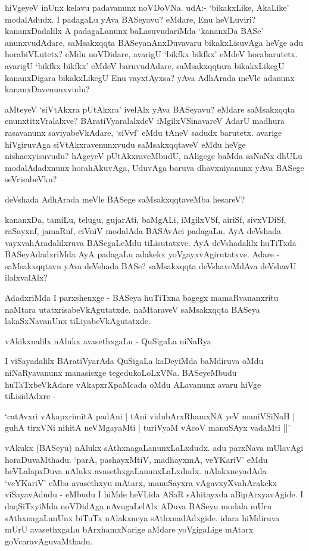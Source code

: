hiVgeyeV inUnx kelavu padavanunx noVDoVNa. udA:- `bikakxLike, AkaLike' modalAdudx. I padagaLu yAva BASeyavu? eMdare, Enu heVLuviri? kananxDadalilx A padagaLanunx baLasuvudariMda `kananxDa BASe' anunxvudAdare, saMsakxqqta BASeyanAnxDuvavaru bikakxLisuvAga heVge adu horabiVLutetx? eMdu noVDidare, avarigU `bikfkx bikfkx' eMdeV horabarutetx. avarigU `bikfkx bikfkx' eMdeV baruvudAdare, saMsakxqqtara bikakxLikegU kananxDigara bikakxLikegU Enu vayxtAyxsa? yAva AdhArada meVle adanunx kananxDavenunxvudu?

aMteyeV `siVtAkxra pUtAkxra' ivelAlx yAva BASeyavu? eMdare saMsakxqqta enunxtitxVralalxve? BAratiVyaralalxdeV iMgilxVSinavareV AdarU madhura rasavanunx saviyabeVkAdare, `siVvf' eMdu tAneV sadudx barutetx. avarige hiVgiruvAga siVtAkxravenunxvudu saMsakxqqtaveV eMdu heVge nishacxyisuvudu? hAgeyeV pUtAkxraveMbudU, nAligege baMda saNaNx dhULu modalAdadxnunx horahAkuvAga, UduvAga baruva dhavxniyanunx yAva BASege seVrisabeVku?

deVshada AdhArada meVle BASege saMsakxqqtaveMba hesareV?

kananxDa, tamiLu, telugu, gujarAti, baMgALi, iMgilxVSf, airiSf, sivxVDiSf, raSayxnf, jamaRnf, ciVniV modalAda BASAvAci padagaLu, AyA deVshada vayxvahAradalilxruva BASegaLeMdu tiLisutatxve. AyA deVshadalilx huTiTxda BASeyAdadxriMda AyA padagaLu adakekx yoVgayxvAgirutatxve. Adare - saMsakxqqtavu yAva deVshada BASe? saMsakxqqta deVshaveMdAva deVshavU ilalxvalAlx?

AdadxriMda I parxshenxge - BASeya huTiTxna bagegx mamaRvananxritu naMtara utatxrisabeVkAgutatxde. naMtaraveV saMsakxqqta BASeya lakaSxNavanUnx tiLiyabeVkAgutatxde.

vAkikxnalilx nAlukx avasethxgaLu - QuSigaLa niNaRya

I viSayadalilx BAratiVyarAda QuSigaLa kaDeyiMda baMdiruva oMdu niNaRyavanunx manasisxge tegedukoLoLxVNa. BASeyeMbudu huTaTxbeVkAdare vAkapxrXpaMcada oMdu ALavanunx avaru hiVge tiLisidAdxre -

\begin{shloka}
`catAvxri vAkapxrimitA padAni | tAni vidubArxRhamxNA yeV maniVSiNaH |\\
guhA tirxVNi nihitA neVMgayaMti | turiVyaM vAcoV manuSAyx vadaMti ||'
\end{shloka}

vAkukx (BASeyu) nAlukx sAthxnagaLanunxLaLxdudx. adu parxNava mUlavAgi horaDuvaMthadu. `parA, pashayxMtiV, madhayxmA, veYKariV' eMdu heVLalapxDuva nAlukx avasethxgaLanunxLaLxdudx. nAlakxneyadAda `veYKariV' eMba avasethxyu mAtarx, manuSayxra vAgavxyXvahArakekx viSayavAdudu - eMbudu I hiMde heVLida ASaR sAhitayxda aBipArxyavAgide. I daqSiTxyiMda noVDidAga nAvugaLelAlx ADuva BASeyu modala mUru sAthxnagaLanUnx biTuTx nAlakxneya sAthxnadAdxgide. idara hiMdiruva mUrU avasethxgaLu bArxhamxNarige aMdare yoVgigaLige mAtarx goVcaravAguvaMthadu.

